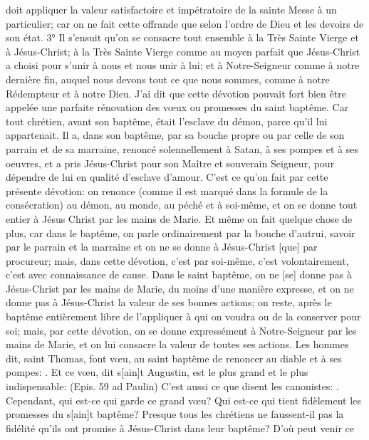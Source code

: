 doit appliquer la valeur satisfactoire et impétratoire de la sainte Messe à un particulier; car on ne fait cette offrande
que selon l'ordre de Dieu et les devoirs de son état.
 3° Il s'ensuit qu'on se consacre tout ensemble à la Très Sainte Vierge et à Jésus-Christ; à la Très Sainte
Vierge comme au moyen parfait que Jésus-Christ a choisi pour s'unir à nous et nous unir à lui; et à Notre-Seigneur
comme à notre dernière fin, auquel nous devons tout ce que nous sommes, comme à notre Rédempteur et à notre
Dieu.
 J'ai dit que cette dévotion pouvait fort bien être appelée une parfaite rénovation des vœux ou promesses du
saint baptême.
Car tout chrétien, avant son baptême, était l'esclave du démon, parce qu'il lui appartenait. Il a, dans son baptême,
par sa bouche propre ou par celle de son parrain et de sa marraine, renoncé solennellement à Satan, à ses
pompes et à ses oeuvres, et a pris Jésus-Christ pour son Maître et souverain Seigneur, pour dépendre de lui en
qualité d'esclave d'amour. C'est ce qu'on fait par cette présente dévotion: on renonce (comme il est marqué dans
la formule de la consécration) au démon, au monde, au péché et à soi-même, et on se donne tout entier à Jésus Christ par les mains de Marie. Et même on fait quelque chose de plus, car dans le baptême, on parle
ordinairement par la bouche d'autrui, savoir par le parrain et la marraine et on ne se donne à Jésus-Christ [que]
par procureur; mais, dans cette dévotion, c'est par soi-même, c'est volontairement, c'est avec connaissance de
cause.
Dans le saint baptême, on ne [se] donne pas à Jésus-Christ par les mains de Marie, du moins d'une manière
expresse, et on ne donne pas à Jésus-Christ la valeur de ses bonnes actions; on reste, après le baptême
entièrement libre de l'appliquer à qui on voudra ou de la conserver pour soi; mais, par cette dévotion, on se donne
expressément à Notre-Seigneur par les mains de Marie, et on lui consacre la valeur de toutes ses actions.
 Les hommes dit, saint Thomas, font vœu, au saint baptême de renoncer au diable et à ses pompes: . Et ce vœu, dit s[ain]t Augustin, est le plus grand
et le plus indispensable:  (Epis. 59 ad Paulin)
C'est aussi ce que disent les canonistes: . Cependant, qui est-ce qui garde ce grand vœu? Qui est-ce qui tient fidèlement les promesses du s[ain]t baptême? Presque tous les
chrétiens ne faussent-il pas la fidélité qu'ils ont promise à Jésus-Christ dans leur baptême? D'où peut venir ce
